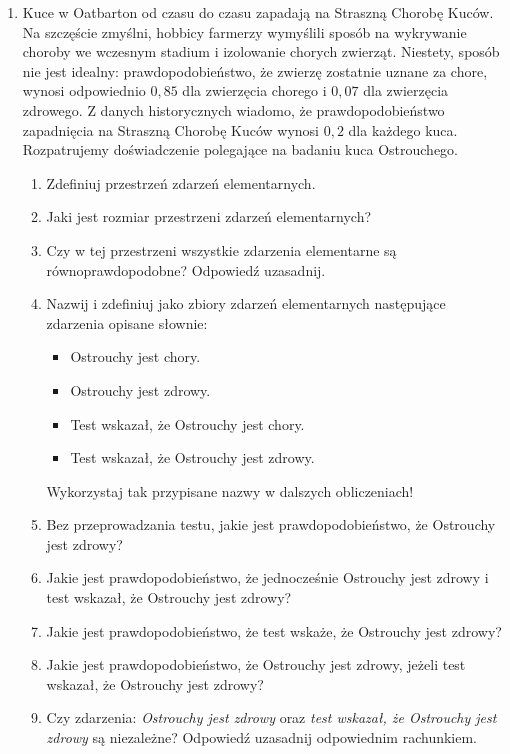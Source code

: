 \documentclass{mwart}
\begin{document}
\begin{enumerate}
\item Kuce w Oatbarton od czasu do czasu zapadają na Straszną Chorobę Kuców.
Na szczęście zmyślni, hobbicy farmerzy wymyślili sposób na wykrywanie choroby we wczesnym stadium i izolowanie chorych zwierząt.
Niestety, sposób nie jest idealny: prawdopodobieństwo, że zwierzę zostatnie uznane za chore, wynosi odpowiednio $0,85$ dla zwierzęcia chorego i $0,07$ dla zwierzęcia zdrowego.
Z danych historycznych wiadomo, że prawdopodobieństwo zapadnięcia na Straszną Chorobę Kuców wynosi $0,2$ dla każdego kuca.
Rozpatrujemy doświadczenie polegające na badaniu kuca Ostrouchego.

\begin{enumerate}
\item Zdefiniuj przestrzeń zdarzeń elementarnych. 
\item Jaki jest rozmiar przestrzeni zdarzeń elementarnych? 
\item Czy w tej przestrzeni wszystkie zdarzenia elementarne są równoprawdopodobne? Odpowiedź uzasadnij. 
\item Nazwij i zdefiniuj jako zbiory zdarzeń elementarnych następujące zdarzenia opisane słownie: 
\begin{itemize}
\item Ostrouchy jest chory.
\item Ostrouchy jest zdrowy.
\item Test wskazał, że Ostrouchy jest chory.
\item Test wskazał, że Ostrouchy jest zdrowy.
\end{itemize}
Wykorzystaj tak przypisane nazwy w dalszych obliczeniach!
\item Bez przeprowadzania testu, jakie jest prawdopodobieństwo, że Ostrouchy jest zdrowy? 
\item Jakie jest prawdopodobieństwo, że jednocześnie Ostrouchy jest zdrowy i test wskazał, że Ostrouchy jest zdrowy? 
\item Jakie jest prawdopodobieństwo, że test wskaże, że Ostrouchy jest zdrowy? 
\item Jakie jest prawdopodobieństwo, że Ostrouchy jest zdrowy, jeżeli test wskazał, że Ostrouchy jest zdrowy? 
\item Czy zdarzenia: \emph{Ostrouchy jest zdrowy} oraz \emph{test wskazał, że Ostrouchy jest zdrowy} są niezależne? Odpowiedź uzasadnij odpowiednim rachunkiem. 
\end{enumerate}

\end{enumerate}
\end{document}
